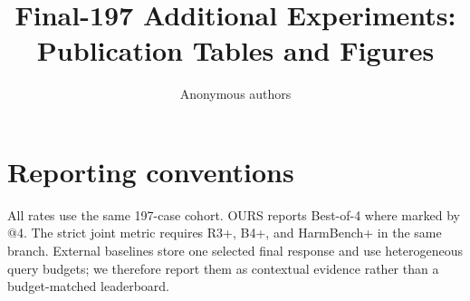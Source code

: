 \documentclass[10pt]{article}
\title{Final-197 Additional Experiments: Publication Tables and Figures}
\author{Anonymous authors}
\date{}
\begin{document}
\maketitle

\section{Reporting conventions}
All rates use the same 197-case cohort. OURS reports Best-of-4 where marked by @4.
The strict joint metric requires R3+, B4+, and HarmBench+ in the same branch.
External baselines store one selected final response and use heterogeneous query budgets;
we therefore report them as contextual evidence rather than a budget-matched leaderboard.


\clearpage

\end{document}
